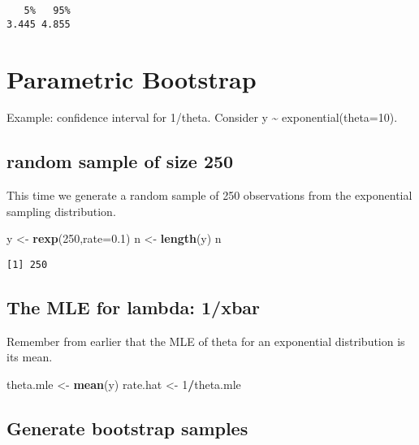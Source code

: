 \documentclass[]{book}
\newenvironment{Shaded}{\begin{snugshade}}{\end{snugshade}}
\newcommand{\KeywordTok}[1]{\textcolor[rgb]{0.13,0.29,0.53}{\textbf{#1}}}
\newcommand{\DataTypeTok}[1]{\textcolor[rgb]{0.13,0.29,0.53}{#1}}
\newcommand{\DecValTok}[1]{\textcolor[rgb]{0.00,0.00,0.81}{#1}}
\newcommand{\FloatTok}[1]{\textcolor[rgb]{0.00,0.00,0.81}{#1}}
\newcommand{\StringTok}[1]{\textcolor[rgb]{0.31,0.60,0.02}{#1}}
\newcommand{\OperatorTok}[1]{\textcolor[rgb]{0.81,0.36,0.00}{\textbf{#1}}}
\newcommand{\NormalTok}[1]{#1}
\theoremstyle{definition}
\theoremstyle{definition}
\theoremstyle{definition}
\theoremstyle{remark}
\begin{document}
\begin{verbatim}
   5%   95% 
3.445 4.855 
\end{verbatim}

\section{Parametric Bootstrap}\label{parametric-bootstrap}

Example: confidence interval for 1/theta. Consider y \textasciitilde{}
exponential(theta=10).

\subsection{random sample of size 250}\label{random-sample-of-size-250}

This time we generate a random sample of 250 observations from the
exponential sampling distribution.

\begin{Shaded}
\begin{Highlighting}[]
\NormalTok{y <-}\StringTok{ }\KeywordTok{rexp}\NormalTok{(}\DecValTok{250}\NormalTok{,}\DataTypeTok{rate=}\FloatTok{0.1}\NormalTok{)}
\NormalTok{n <-}\StringTok{ }\KeywordTok{length}\NormalTok{(y)}
\NormalTok{n}
\end{Highlighting}
\end{Shaded}

\begin{verbatim}
[1] 250
\end{verbatim}

\subsection{The MLE for lambda: 1/xbar}\label{the-mle-for-lambda-1xbar}

Remember from earlier that the MLE of theta for an exponential
distribution is its mean.

\begin{Shaded}
\begin{Highlighting}[]
\NormalTok{theta.mle <-}\StringTok{ }\KeywordTok{mean}\NormalTok{(y)}
\NormalTok{rate.hat <-}\StringTok{ }\DecValTok{1}\OperatorTok{/}\NormalTok{theta.mle}
\end{Highlighting}
\end{Shaded}

\subsection{Generate bootstrap
samples}\label{generate-bootstrap-samples}
\end{document}
